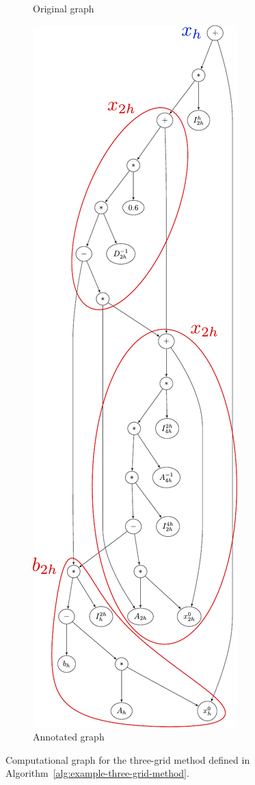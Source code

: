 \begin{figure}
\begin{subfigure}[b]{0.49\textwidth}
		\caption{Original graph}
		\label{fig:example-three-grid-method-computational-graph-original}
	\end{subfigure}
	\begin{subfigure}[b]{0.49\textwidth}
 	\centering
		\includegraphics[height=0.925\textheight]{figures/trees/three_grid_method_computational_graph_annotated.pdf}
		\caption{Annotated graph}
		\label{fig:example-three-grid-method-computational-graph-annotated}
	\end{subfigure}
	\caption{Computational graph for the three-grid method defined in Algorithm~\ref{alg:example-three-grid-method}.}
	\label{fig:example-three-grid-method-computational-graph}
\end{figure}
